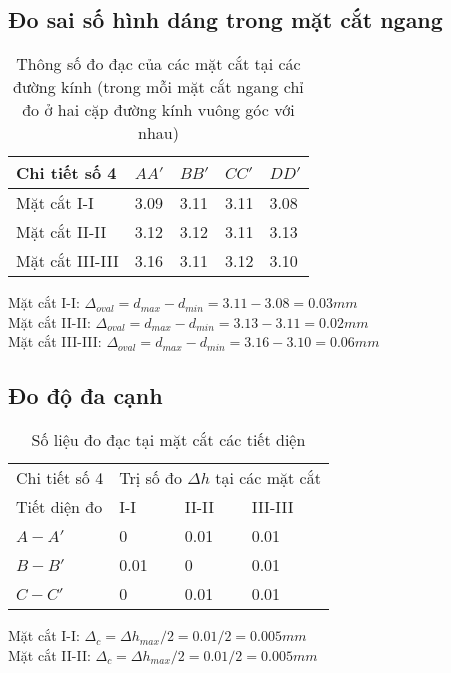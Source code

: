\subsection{Đo sai số hình dáng trong mặt cắt ngang}
\begin{table}[h]
	\centering
	\caption{Thông số đo đạc của các mặt cắt tại các đường kính (trong mỗi mặt cắt ngang chỉ đo ở hai cặp đường kính vuông góc với nhau)}
	\begin{tabular}{lllll}\toprule
		Chi tiết số 4 & $ AA' $ & $ BB' $ & $ CC' $ & $ DD' $\\\midrule
		Mặt cắt I-I & 3.09 & 3.11 & 3.11 & 3.08\\
		Mặt cắt II-II & 3.12 & 3.12 & 3.11 & 3.13\\
		Mặt cắt III-III & 3.16 & 3.11 & 3.12 & 3.10\\\bottomrule
	\end{tabular}
\end{table}
Mặt cắt I-I: $ \Delta_{oval} = d_{max} - d_{min} = 3.11-3.08 = 0.03 \unit{mm} $\\

Mặt cắt II-II: $ \Delta_{oval} = d_{max} - d_{min} = 3.13-3.11 = 0.02 \unit{mm} $\\

Mặt cắt III-III: $ \Delta_{oval} = d_{max} - d_{min} = 3.16-3.10 = 0.06 \unit{mm} $

\subsection{Đo độ đa cạnh}

\begin{table}[h]
	\centering
	\caption{Số liệu đo đạc tại mặt cắt các tiết diện}
	\begin{tabular}{llll}\toprule
		Chi tiết số 4 & \multicolumn{3}{l}{Trị số đo $ \Delta h $ tại các mặt cắt}\\\cmidrule(r{4pt}){2-4}
		Tiết diện đo & I-I & II-II & III-III\\\midrule
		$ A-A' $ & 0 & 0.01 & 0.01\\
		$ B-B' $ & 0.01 & 0 & 0.01\\
		$ C-C' $ & 0 & 0.01 & 0.01\\\bottomrule
	\end{tabular}
\end{table}
Mặt cắt I-I: $ \Delta_c = \Delta h_{max}/2 = 0.01/2 = 0.005 \unit{mm} $\\

Mặt cắt II-II: $ \Delta_c = \Delta h_{max}/2 = 0.01/2 = 0.005 \unit{mm} $\\


